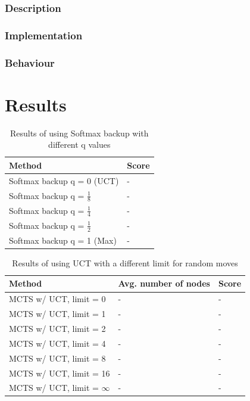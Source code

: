 \documentclass[10pt,a4paper]{article}
\begin{document}
\subsubsection{Description}
\subsubsection{Implementation}
\subsubsection{Behaviour}

\clearpage

\section{Results}
\renewcommand{\arraystretch}{1.5}
\begin{table}[h]
	\centering
	\begin{tabular}{| l | l |}
		\hline
		\textbf{Method} & \textbf{Score} 		\\ \hline
		Softmax backup q = 0 (UCT) 			& - \\ \hline
		Softmax backup q = $\frac{1}{8}$	& - \\ \hline
		Softmax backup q = $\frac{1}{4}$	& - \\ \hline
		Softmax backup q = $\frac{1}{2}$	& - \\ \hline
		Softmax backup q = 1 (Max)			& - \\ \hline
	\end{tabular}
	\caption{Results of using Softmax backup with different q values}
	\label{tab:softmax_results}
\end{table}

\begin{table}[h]
	\centering
	\begin{tabular}{| l | l | l |}
		\hline
		\textbf{Method} & \textbf{Avg. number of nodes} & \textbf{Score} \\ \hline
		MCTS w/ UCT, limit = 0			& - & - \\ \hline
		MCTS w/ UCT, limit = 1			& - & - \\ \hline
		MCTS w/ UCT, limit = 2			& - & - \\ \hline
		MCTS w/ UCT, limit = 4			& - & - \\ \hline
		MCTS w/ UCT, limit = 8			& - & - \\ \hline
		MCTS w/ UCT, limit = 16			& - & - \\ \hline
		MCTS w/ UCT, limit = $\infty$	& - & - \\ \hline
	\end{tabular}
	\caption{Results of using UCT with a different limit for random moves}
	\label{tab:uct_results}
\end{table}
\end{document}
